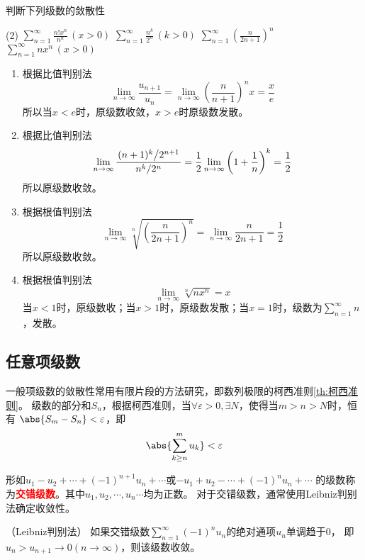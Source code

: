 \begin{example}
    判断下列级数的敛散性
    \begin{tasks}[label=(\arabic*),label-width = 2em](2)
        \task $\displaystyle \sum_{n=1}^\infty \frac{n!x^n}{n^n}\,(x>0)$
        \task $\displaystyle \sum_{n=1}^\infty \frac{n^k}{2^n}\,(k>0)$
        \task $\displaystyle \sum_{n=1}^\infty \left(\frac{n}{2n+1}\right)^n$
        \task $\displaystyle \sum_{n=1}^\infty nx^n\,(x>0)$
    \end{tasks}
\end{example}
\begin{solution}
    \begin{enumerate}[(1)]
        \item 根据比值判别法
              \[ \lim_{n\to\infty} \frac{u_{n+1}}{u_n} = \lim_{n\to\infty} \left(\frac{n}{n+1}\right)^{n}x = \frac{x}{e}\]
              所以当$x<e$时，原级数收敛，$x>e$时原级数发散。
        \item 根据比值判别法
              \[
                  \lim_{n\to\infty} \frac{\left.(n+1)^k\middle/2^{n+1}\right.}{\left.n^k\middle/2^{n}\right.}
                  =
                  \frac{1}{2}\lim_{n\to\infty} \left(1+\frac{1}{n}\right)^k
                  =
                  \frac{1}{2}
              \]
              所以原级数收敛。
        \item 根据根值判别法
              \[
                  \lim_{n\to\infty} \sqrt[n]{\left(\frac{n}{2n+1}\right)^n}
                  =
                  \lim_{n\to\infty} \frac{n}{2n+1}
                  =
                  \frac{1}{2}
              \]
              所以原级数收敛。
        \item 根据根值判别法
              \[ \lim_{n\to\infty} \sqrt[n]{nx^n} = x \]
              当$x<1$时，原级数收；当$x>1$时，原级数发散；当$x=1$时，级数为$\displaystyle\sum_{n=1}^\infty n$，发散。
    \end{enumerate}
\end{solution}

\subsection{任意项级数}
一般项级数的敛散性常用有限片段的方法研究，即数列极限的柯西准则\ref{th:柯西准则}。
级数的部分和$S_n$，根据柯西准则，当$\forall \varepsilon > 0,\exists N$，使得当$m>n>N$时，恒有
$\abs{S_m-S_n}<\varepsilon$，即
\[ \abs{\sum_{k\geq n}^m u_k}<\varepsilon \]


形如$u_1 - u_2 + \cdots + (-1)^{n+1}u_n + \cdots$或$-u_1 + u_2 - \cdots + (-1)^n u_n + \cdots$
的级数称为\textcolor{red}{\textbf{\textsf{交错级数}}}。其中$u_1,u_2,\cdots,u_n\cdots$均为正数。
对于交错级数，通常使用Leibniz判别法确定收敛性。
\begin{theorem}
    （Leibniz判别法）
    \label{th:Leibniz判别法}
    如果交错级数$\displaystyle\sum_{n=1}^\infty(-1)^n u_n$的绝对通项$u_n$单调趋于$0$，
    即$u_n>u_{n+1}\to 0(n\to\infty)$，则该级数收敛。
\end{theorem}

